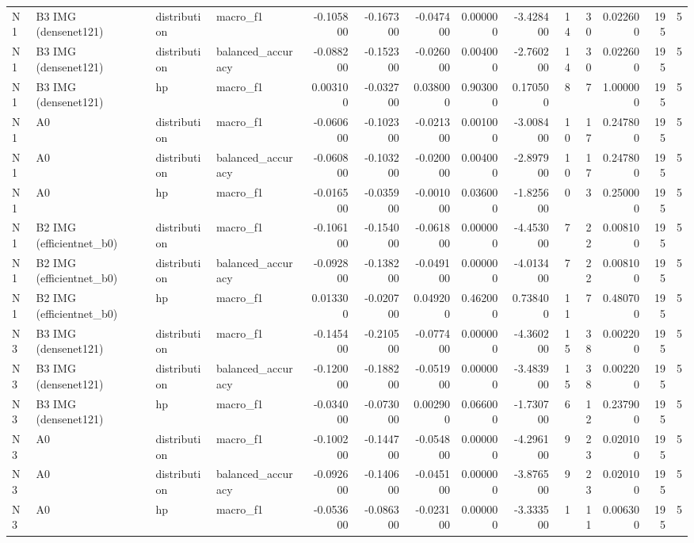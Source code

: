 \begin{table}
\begin{tabular}{llllrrrrrrrrrr}
N1 & B3 IMG (densenet121) & distribution & macro\_f1 & -0.105800 & -0.167300 & -0.047400 & 0.000000 & -3.428400 & 14 & 30 & 0.022600 & 195 & 5 \\
N1 & B3 IMG (densenet121) & distribution & balanced\_accuracy & -0.088200 & -0.152300 & -0.026000 & 0.004000 & -2.760200 & 14 & 30 & 0.022600 & 195 & 5 \\
N1 & B3 IMG (densenet121) & hp & macro\_f1 & 0.003100 & -0.032700 & 0.038000 & 0.903000 & 0.170500 & 8 & 7 & 1.000000 & 195 & 5 \\
N1 & A0 & distribution & macro\_f1 & -0.060600 & -0.102300 & -0.021300 & 0.001000 & -3.008400 & 10 & 17 & 0.247800 & 195 & 5 \\
N1 & A0 & distribution & balanced\_accuracy & -0.060800 & -0.103200 & -0.020000 & 0.004000 & -2.897900 & 10 & 17 & 0.247800 & 195 & 5 \\
N1 & A0 & hp & macro\_f1 & -0.016500 & -0.035900 & -0.001000 & 0.036000 & -1.825600 & 0 & 3 & 0.250000 & 195 & 5 \\
N1 & B2 IMG (efficientnet\_b0) & distribution & macro\_f1 & -0.106100 & -0.154000 & -0.061800 & 0.000000 & -4.453000 & 7 & 22 & 0.008100 & 195 & 5 \\
N1 & B2 IMG (efficientnet\_b0) & distribution & balanced\_accuracy & -0.092800 & -0.138200 & -0.049100 & 0.000000 & -4.013400 & 7 & 22 & 0.008100 & 195 & 5 \\
N1 & B2 IMG (efficientnet\_b0) & hp & macro\_f1 & 0.013300 & -0.020700 & 0.049200 & 0.462000 & 0.738400 & 11 & 7 & 0.480700 & 195 & 5 \\
N3 & B3 IMG (densenet121) & distribution & macro\_f1 & -0.145400 & -0.210500 & -0.077400 & 0.000000 & -4.360200 & 15 & 38 & 0.002200 & 195 & 5 \\
N3 & B3 IMG (densenet121) & distribution & balanced\_accuracy & -0.120000 & -0.188200 & -0.051900 & 0.000000 & -3.483900 & 15 & 38 & 0.002200 & 195 & 5 \\
N3 & B3 IMG (densenet121) & hp & macro\_f1 & -0.034000 & -0.073000 & 0.002900 & 0.066000 & -1.730700 & 6 & 12 & 0.237900 & 195 & 5 \\
N3 & A0 & distribution & macro\_f1 & -0.100200 & -0.144700 & -0.054800 & 0.000000 & -4.296100 & 9 & 23 & 0.020100 & 195 & 5 \\
N3 & A0 & distribution & balanced\_accuracy & -0.092600 & -0.140600 & -0.045100 & 0.000000 & -3.876500 & 9 & 23 & 0.020100 & 195 & 5 \\
N3 & A0 & hp & macro\_f1 & -0.053600 & -0.086300 & -0.023100 & 0.000000 & -3.333500 & 1 & 11 & 0.006300 & 195 & 5 \\

\end{tabular}
\end{table}
